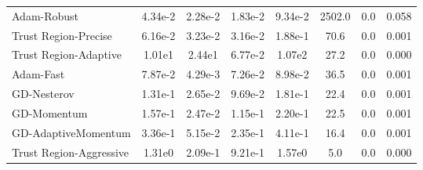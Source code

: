 \documentclass{article}
\begin{document}
\begin{table}[htbp]
{\begin{tabular}{p{2.5cm}*{7}{c}}
Adam-Robust & 4.34e-2 & 2.28e-2 & 1.83e-2 & 9.34e-2 & 2502.0 & 0.0 & 0.058 \\
Trust Region-Precise & 6.16e-2 & 3.23e-2 & 3.16e-2 & 1.88e-1 & 70.6 & 0.0 & 0.001 \\
Trust Region-Adaptive & 1.01e1 & 2.44e1 & 6.77e-2 & 1.07e2 & 27.2 & 0.0 & 0.000 \\
Adam-Fast & 7.87e-2 & 4.29e-3 & 7.26e-2 & 8.98e-2 & 36.5 & 0.0 & 0.001 \\
GD-Nesterov & 1.31e-1 & 2.65e-2 & 9.69e-2 & 1.81e-1 & 22.4 & 0.0 & 0.001 \\
GD-Momentum & 1.57e-1 & 2.47e-2 & 1.15e-1 & 2.20e-1 & 22.5 & 0.0 & 0.001 \\
GD-AdaptiveMomentum & 3.36e-1 & 5.15e-2 & 2.35e-1 & 4.11e-1 & 16.4 & 0.0 & 0.001 \\
Trust Region-Aggressive & 1.31e0 & 2.09e-1 & 9.21e-1 & 1.57e0 & 5.0 & 0.0 & 0.000 \\
\bottomrule
\end{tabular}
}
\end{table}
\end{document}
